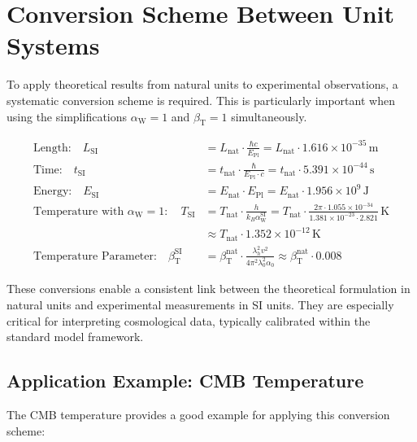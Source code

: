 \documentclass[12pt,a4paper]{article}
\newcommand{\betaT}{\beta_{\text{T}}}
\newcommand{\alphaW}{\alpha_{\text{W}}}
\begin{document}
	\section{Conversion Scheme Between Unit Systems}
	
	To apply theoretical results from natural units to experimental observations, a systematic conversion scheme is required. This is particularly important when using the simplifications \(\alphaW = 1\) and \(\betaT = 1\) simultaneously.
	
	\begin{tcolorbox}[colback=blue!5!white,colframe=blue!75!black,title=Conversion Scheme Between Unit Systems]
		\begin{align}
			\text{Length:} \quad L_{\text{SI}} &= L_{\text{nat}} \cdot \frac{\hbar c}{E_{\text{Pl}}} = L_{\text{nat}} \cdot 1.616 \times 10^{-35} \, \text{m} \\
			\text{Time:} \quad t_{\text{SI}} &= t_{\text{nat}} \cdot \frac{\hbar}{E_{\text{Pl}} \cdot c} = t_{\text{nat}} \cdot 5.391 \times 10^{-44} \, \text{s} \\
			\text{Energy:} \quad E_{\text{SI}} &= E_{\text{nat}} \cdot E_{\text{Pl}} = E_{\text{nat}} \cdot 1.956 \times 10^9 \, \text{J} \\
			\text{Temperature with } \alphaW = 1: \quad T_{\text{SI}} &= T_{\text{nat}} \cdot \frac{h}{k_B \alphaW^{\text{SI}}} = T_{\text{nat}} \cdot \frac{2\pi \cdot 1.055 \times 10^{-34}}{1.381 \times 10^{-23} \cdot 2.821} \, \text{K} \\
			&\approx T_{\text{nat}} \cdot 1.352 \times 10^{-12} \, \text{K} \\
			\text{Temperature Parameter:} \quad \betaT^{\text{SI}} &= \betaT^{\text{nat}} \cdot \frac{\lambda_h^2 v^2}{4\pi^2 \lambda_0^2 \alpha_0} \approx \betaT^{\text{nat}} \cdot 0.008
		\end{align}
	\end{tcolorbox}
	
	These conversions enable a consistent link between the theoretical formulation in natural units and experimental measurements in SI units. They are especially critical for interpreting cosmological data, typically calibrated within the standard model framework.
	
	\subsection{Application Example: CMB Temperature}
	
	The CMB temperature provides a good example for applying this conversion scheme:
	
\end{document}
